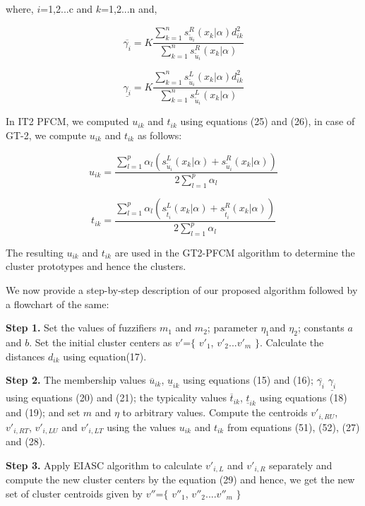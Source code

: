 \documentclass[journal, onecolumn]{IEEEtran}
\begin{document}
where, $i$={1,2...c} and $k$={1,2...n} and, 

\begin{equation}
\overline{\gamma_i}= K \frac{\sum_{k=1}^n s_{{\tilde{u}}_i}^R(x_k|\alpha) d_{ik}^2}{\sum_{k=1}^n s_{{\tilde{u}}_i}^R(x_k|\alpha)}
\end{equation}

\begin{equation}
\underline{\gamma_i}= K \frac{\sum_{k=1}^n s_{{\tilde{u}}_i}^L(x_k|\alpha) d_{ik}^2}{\sum_{k=1}^n s_{{\tilde{u}}_i}^L(x_k|\alpha)}
\end{equation}

In IT2 PFCM, we computed $u_{ik}$ and $t_{ik}$ using equations (25) and (26), in case of GT-2, we compute $u_{ik}$ and $t_{ik}$ as follows: 

\begin{equation}
u_{ik}= \frac{\sum_{l=1}^p {\alpha_l}(s_{{\tilde{u}}_i}^L(x_k|\alpha)+s_{{\tilde{u}}_i}^R(x_k|\alpha) )}{2 \sum_{l=1}^p {\alpha_l}}	
\end{equation}

\begin{equation}
t_{ik}=\frac{\sum_{l=1}^p {\alpha_l}(s_{{\tilde{t}}_i}^L(x_k|\alpha)+s_{{\tilde{t}}_i}^R(x_k|\alpha) )}{2 \sum_{l=1}^p {\alpha_l}}
\end{equation}

The resulting $u_{ik}$ and $t_{ik}$ are used in the GT2-PFCM algorithm to determine the cluster prototypes and hence the clusters.

We now provide a step-by-step description of our proposed algorithm followed by a flowchart of the same: 

\textbf{Step 1.}
Set the values of fuzzifiers $m_1$ and $m_2$; parameter $\eta_1$and $\eta_2$; constants $a$ and $b$. Set the initial cluster centers as $v'$=$\{$ $v'_1$, $v'_2$...$v'_m$ $\}$. Calculate the distances $d_{ik}$ using equation(17).

\textbf{Step 2.}
The membership values $\overline{u}_{ik}$, $\underline{u}_{ik}$ using equations (15) and (16); $\overline{\gamma_i}$ $\underline{\gamma_i}$ using equations (20) and (21); the typicality values $\overline{t}_{ik}$, $\underline{t}_{ik}$ using equations (18) and (19); and  set $m$ and $\eta$ to arbitrary values. Compute the centroids $v'_{i,RU}$, $v'_{i,RT}$, $v'_{i,LU}$ and $v'_{i,LT}$ using the values ${u}_{ik}$ and $t_{ik}$ from equations (51), (52), (27) and (28).



\textbf{Step 3.}
Apply EIASC algorithm to calculate $v'_{i,L}$ and $v'_{i,R}$ separately and compute the new cluster centers by the equation (29) and hence, we get the new set of cluster centroids given by $v''$=$\{$ $v''_1$, $v''_2$....$v''_m$ $\}$
\end{document}
